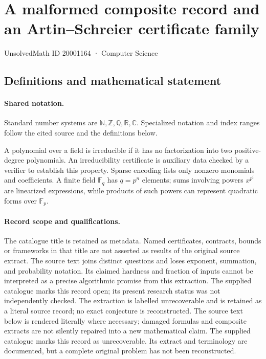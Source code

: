 \documentclass[11pt]{article}
\begin{document}
\setcounter{section}{20001163}
\section{A malformed composite record and an Artin--Schreier certificate family}\label{20001164}
{\small\sffamily UnsolvedMath ID 20001164 · Computer Science}
\subsection{Definitions and mathematical statement}

\paragraph{Shared notation.}Standard number systems are $\mathbb N,\mathbb Z,\mathbb Q,\mathbb R,\mathbb C$. Specialized notation and index ranges follow the cited source and the definitions below.


A polynomial over a field is irreducible if it has no factorization into two positive-degree polynomials. An irreducibility certificate is auxiliary data checked by a verifier to establish this property. Sparse encoding lists only nonzero monomials and coefficients. A finite field $\mathbb F_q$ has $q=p^n$ elements; sums involving powers $x^{p^i}$ are linearized expressions, while products of such powers can represent quadratic forms over $\mathbb F_p$.
\paragraph{Record scope and qualifications.}
The catalogue title is retained as metadata. Named certificates, contracts, bounds or frameworks in that title are not asserted as results of the original source extract.
The source text joins distinct questions and loses exponent, summation, and probability notation. Its claimed hardness and fraction of inputs cannot be interpreted as a precise algorithmic promise from this extraction. The supplied catalogue marks this record open; its present research status was not independently checked. The extraction is labelled unrecoverable and is retained as a literal source record; no exact conjecture is reconstructed.
The source text below is rendered literally where necessary; damaged formulas and composite extracts are not silently repaired into a new mathematical claim.
The supplied catalogue marks this record as unrecoverable. Its extract and terminology are documented, but a complete original problem has not been reconstructed.
\end{document}
